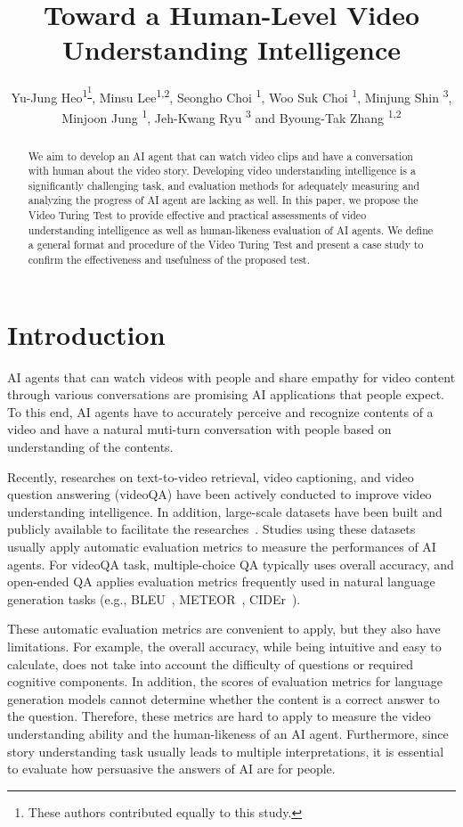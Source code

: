 \documentclass[letterpaper]{article} %
\title{Toward a Human-Level Video Understanding Intelligence}
\author {
    Yu-Jung Heo\textsuperscript{\rm 1\thanks{These authors contributed equally to this study.}},
    Minsu Lee\textsuperscript{\rm 1,2\footnotemark[1]},
    Seongho Choi \textsuperscript{\rm 1},
    Woo Suk Choi \textsuperscript{\rm 1},
    Minjung Shin \textsuperscript{\rm 3},
    Minjoon Jung \textsuperscript{\rm 1},
    Jeh-Kwang Ryu \textsuperscript{\rm 3} and
    Byoung-Tak Zhang \textsuperscript{\rm 1,2}\\
}
\begin{document}
\maketitle

\begin{abstract}
We aim to develop an AI agent that can watch video clips and have a conversation with human about the video story. Developing video understanding intelligence is a significantly challenging task, and evaluation methods for adequately measuring and analyzing the progress of AI agent are lacking as well.
In this paper, we propose the Video Turing Test to provide effective and practical assessments of video understanding intelligence as well as human-likeness evaluation of AI agents. We define a general format and procedure of the Video Turing Test and present a case study to confirm the effectiveness and usefulness of the proposed test.
\end{abstract}

\section{Introduction} %
AI agents that can watch videos with people and share empathy for video content through various conversations are promising AI applications that people expect. To this end, AI agents have to accurately perceive and recognize contents of a video and have a natural muti-turn conversation with people based on understanding of the contents.

Recently, researches on text-to-video retrieval, video captioning, and video question answering (videoQA) have been actively conducted to improve video understanding intelligence. In addition, large-scale datasets have been built and publicly available to facilitate the researches~\cite{alamri2019audio,lei2018tvqa,lei2020tvr,choi2021dramaqa}. Studies using these datasets usually apply automatic evaluation metrics to measure the performances of AI agents.
For videoQA task, multiple-choice QA typically uses overall accuracy, and open-ended QA applies evaluation metrics frequently used in natural language generation tasks (e.g., BLEU~\cite{papineni2002bleu}, METEOR~\cite{banerjee2005meteor}, CIDEr~\cite{vedantam2015cider}).

These automatic evaluation metrics are convenient to apply, but they also have limitations.
For example, the overall accuracy, while being intuitive and easy to calculate, does not take into account the difficulty of questions or required cognitive components.
In addition, the scores of evaluation metrics for language generation models cannot determine whether the content is a correct answer to the question.
Therefore, these metrics are hard to apply to measure the video understanding ability and the human-likeness of an AI agent.
Furthermore, since story understanding task usually leads to multiple interpretations, it is essential to evaluate how persuasive the answers of AI are for people.
\end{document}
